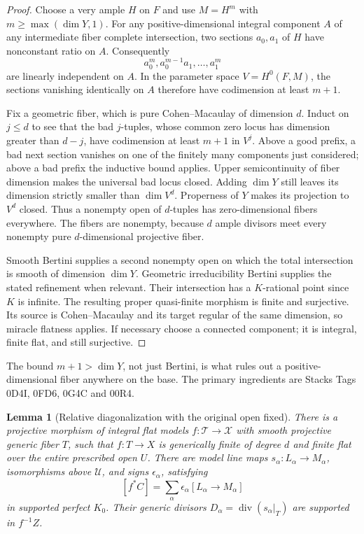 \documentclass[11pt]{article}
\newtheorem{lemma}[theorem]{Lemma}
\theoremstyle{definition}
\theoremstyle{remark}
\numberwithin{equation}{section}
\begin{document}
\begin{proof}
Choose a very ample $H$ on $F$ and use $M=H^m$ with
$m\geq\max(\dim Y,1)$.  For any positive-dimensional integral component
$A$ of any intermediate fiber complete intersection, two sections
$a_0,a_1$ of $H$ have nonconstant ratio on $A$.  Consequently
\[
                    a_0^m,a_0^{m-1}a_1,\ldots,a_1^m
\]
are linearly independent on $A$.  In the parameter space
$V=H^0(F,M)$, the sections vanishing identically on $A$ therefore
have codimension at least $m+1$.

Fix a geometric fiber, which is pure Cohen--Macaulay of dimension $d$.
Induct on $j\leq d$ to see that the bad $j$-tuples, whose common
zero locus has dimension greater than $d-j$, have codimension at least
$m+1$ in $V^j$.  Above a good prefix, a bad next section vanishes
on one of the finitely many components just considered; above a bad
prefix the inductive bound applies.  Upper semicontinuity of fiber
dimension makes the universal bad locus closed.  Adding $\dim Y$
still leaves its dimension strictly smaller than $\dim V^d$.
Properness of $Y$ makes its projection to $V^d$ closed.  Thus a
nonempty open of $d$-tuples has zero-dimensional fibers everywhere.
The fibers are nonempty, because $d$ ample divisors meet every
nonempty pure $d$-dimensional projective fiber.

Smooth Bertini supplies a second nonempty open on which the total
intersection is smooth of dimension $\dim Y$.  Geometric irreducibility
Bertini supplies the stated refinement when relevant.  Their intersection
has a $K$-rational point since $K$ is infinite.  The resulting proper
quasi-finite morphism is finite and surjective.  Its source is
Cohen--Macaulay and its target regular of the same dimension, so
miracle flatness applies.  If necessary choose a connected component;
it is integral, finite flat, and still surjective.
\end{proof}

The bound $m+1>\dim Y$, not just Bertini, is what rules out a
positive-dimensional fiber anywhere on the base.  The primary
ingredients are Stacks Tags 0D4I, 0FD6, 0G4C and 00R4.

\begin{lemma}[Relative diagonalization with the original open fixed]
\label{r11p:relative-lines}
There is a projective morphism of integral flat models
$f:\mathcal T\to\mathcal X$ with smooth projective generic fiber $T$,
such that $f:T\to X$ is generically finite of degree $d$ and finite
flat over the \emph{entire} prescribed open $U$.  There are model
line maps $s_\alpha:L_\alpha\to M_\alpha$, isomorphisms above
$\mathcal U$, and signs $\epsilon_\alpha$, satisfying
\[
                 [f^*C]
                   =\sum_\alpha\epsilon_\alpha[L_\alpha\to M_\alpha]
\tag{PC2}\label{r11p:supported-k-equality}
\]
in supported perfect $K_0$.  Their generic divisors
$D_\alpha=\operatorname{div}(s_\alpha|_T)$ are supported in $f^{-1}Z$.
\end{lemma}
\end{document}
